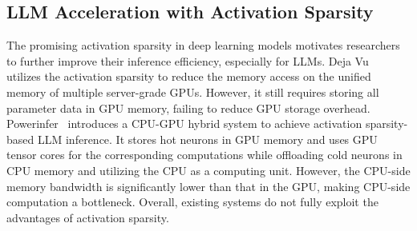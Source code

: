 \subsection{LLM Acceleration with Activation Sparsity}\label{sec:related-works-sparsity}


The promising activation sparsity in deep learning models motivates researchers~\cite{zheng2023pit, cui2023optimizing,liu2024drift} to further improve their inference efficiency, especially for LLMs. Deja Vu~\cite{liu2023deja} utilizes the activation sparsity to reduce the memory access on the unified memory of multiple server-grade GPUs. However, it still requires storing all parameter data in GPU memory, failing to reduce GPU storage overhead. Powerinfer~\cite{song2023powerinfer} introduces a CPU-GPU hybrid system to achieve activation sparsity-based LLM inference. It stores hot neurons in GPU memory and uses GPU tensor cores for the corresponding computations while offloading cold neurons in CPU memory and utilizing the CPU as a computing unit. However, the CPU-side memory bandwidth is significantly lower than that in the GPU, making CPU-side computation a bottleneck. Overall, existing systems do not fully exploit the advantages of activation sparsity.